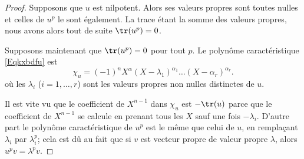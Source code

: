 \begin{proof}
    Supposons que \( u\) est nilpotent. Alors ses valeurs propres sont toutes nulles et celles de \( u^p\) le sont également. La trace étant la somme des valeurs propres, nous avons alors tout de suite \( \tr(u^p)=0\).

    Supposons maintenant que \( \tr(u^p)=0\) pour tout \( p\). Le polynôme caractéristique \eqref{Eqkxbdfu} est
    \begin{equation}    \label{EqfnCqWq}
        \chi_u=(-1)^nX^{\alpha}(X-\lambda_1)^{\alpha_1}\ldots (X-\alpha_r)^{\alpha_r}.
    \end{equation}
    où les \( \lambda_i\) (\( i=1,\ldots, r\)) sont les valeurs propres non nulles distinctes de \( u\).

    Il est vite vu que le coefficient de \( X^{n-1}\) dans \( \chi_u\) est \( -\tr(u)\) parce que le coefficient de \( X^{n-1}\) se calcule en prenant tous les $X$ sauf une fois \( -\lambda_i\). D'autre part le polynôme caractéristique de \( u^p \) est le même que celui de \( u\), en remplaçant \( \lambda_i\) par \( \lambda_i^p\); cela est dû au fait que si \( v\) est vecteur propre de valeur propre \( \lambda\), alors \( u^pv=\lambda^pv\).


\end{proof}
